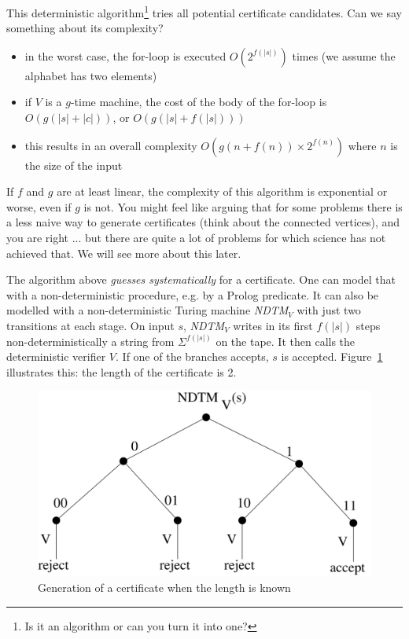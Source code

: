 This deterministic algorithm\footnote{Is it an algorithm or can you
turn it into one?} tries all potential certificate candidates. Can we
say something about its complexity?


\begin{itemize}
\item
in the worst case, the for-loop is executed $O(2^{f(|s|)})$ times (we assume
the alphabet has two elements)
\item
if $V$ is a $g$-time machine, the cost of the body of the for-loop is
$O(g(|s|+|c|))$, or $O(g(|s|+f(|s|)))$
\item
this results in an overall complexity $O(g(n+f(n))\times 2^{f(n)})$
where $n$ is the size of the input
\end{itemize}

If $f$ and $g$ are at least linear, the complexity of this algorithm
is exponential or worse, even if $g$ is not. You might feel like
arguing that for some problems there is a less naive way to generate
certificates (think about the connected vertices), and you are right
... but there are quite a lot of problems for which science has not
achieved that. We will see more about this later.

The algorithm above {\em guesses systematically} for a
certificate. One can model that with a non-deterministic procedure,
e.g. by a Prolog predicate. It can also be modelled with a
non-deterministic Turing machine {\em NDTM$_V$} with just two
transitions at each stage. On input $s$, {\em NDTM$_V$} writes in its
first $f(|s|)$ steps non-deterministically a string from
$\Sigma^{f(|s|)}$ on the tape. It then calls the deterministic
verifier $V$. If one of the branches accepts, $s$ is accepted.
Figure~\ref{nondetverifier} illustrates this: the length of the
certificate is 2.


\begin{figure}[h]
\begin{center}
\includegraphics[height=0.2\textheight,keepaspectratio]{nondetverifier}
\caption{Generation of a certificate when the length is
known}\label{nondetverifier}
\end{center}
\end{figure}

